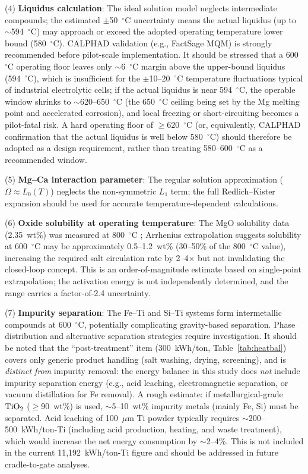 \documentclass[sn-mathphys,Numbered]{sn-jnl}
\begin{document}
(4) \textbf{Liquidus calculation}: The ideal solution model neglects intermediate compounds; the estimated $\pm$50~$^{\circ}$C uncertainty means the actual liquidus (up to $\sim$594~$^{\circ}$C) may approach or exceed the adopted operating temperature lower bound (580~$^{\circ}$C). CALPHAD validation (e.g., FactSage MQM) is strongly recommended before pilot-scale implementation. It should be stressed that a 600~$^{\circ}$C operating floor leaves only $\sim$6~$^{\circ}$C margin above the upper-bound liquidus (594~$^{\circ}$C), which is insufficient for the $\pm$10--20~$^{\circ}$C temperature fluctuations typical of industrial electrolytic cells; if the actual liquidus is near 594~$^{\circ}$C, the operable window shrinks to $\sim$620--650~$^{\circ}$C (the 650~$^{\circ}$C ceiling being set by the Mg melting point and accelerated corrosion), and local freezing or short-circuiting becomes a pilot-fatal risk. A hard operating floor of $\geq$620~$^{\circ}$C (or, equivalently, CALPHAD confirmation that the actual liquidus is well below 580~$^{\circ}$C) should therefore be adopted as a design requirement, rather than treating 580--600~$^{\circ}$C as a recommended window.

(5) \textbf{Mg--Ca interaction parameter}: The regular solution approximation ($\Omega \approx L_0(T)$) neglects the non-symmetric $L_1$ term; the full Redlich--Kister expansion \cite{zhang2008mgce} should be used for accurate temperature-dependent calculations.

(6) \textbf{Oxide solubility at operating temperature}: The MgO solubility data (2.35~wt\%) was measured at 800~$^{\circ}$C \cite{morita2004}; Arrhenius extrapolation suggests solubility at 600~$^{\circ}$C may be approximately 0.5--1.2~wt\% (30--50\% of the 800~$^{\circ}$C value), increasing the required salt circulation rate by 2--4$\times$ but not invalidating the closed-loop concept. This is an order-of-magnitude estimate based on single-point extrapolation; the activation energy is not independently determined, and the range carries a factor-of-2.4 uncertainty.

(7) \textbf{Impurity separation}: The Fe--Ti and Si--Ti systems form intermetallic compounds at 600~$^{\circ}$C, potentially complicating gravity-based separation. Phase distribution and alternative separation strategies require investigation. It should be noted that the ``post-treatment'' item (300~kWh/ton, Table~\ref{tab:heatbal}) covers only generic product handling (salt washing, drying, screening), and is \emph{distinct from} impurity removal: the energy balance in this study does \emph{not} include impurity separation energy (e.g., acid leaching, electromagnetic separation, or vacuum distillation for Fe removal). A rough estimate: if metallurgical-grade $\ce{TiO2}$ ($\geq$90~wt\%) is used, $\sim$5--10~wt\% impurity metals (mainly Fe, Si) must be separated. Acid leaching of 100~$\mu$m Ti powder typically requires $\sim$200--500~kWh/ton-Ti (including acid production, heating, and waste treatment), which would increase the net energy consumption by $\sim$2--4\%. This is not included in the current 11{,}192~kWh/ton-Ti figure and should be addressed in future cradle-to-gate analyses.
\end{document}

